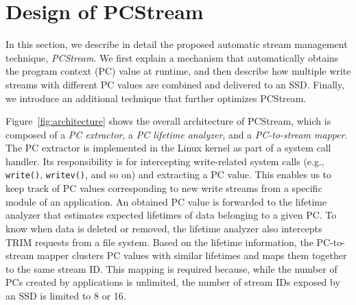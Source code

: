 \section{Design of PCStream}
In this section, we describe in detail the proposed automatic stream management
technique, \textit{PCStream}.  We first explain a mechanism that automatically
obtains the program context (PC) value at runtime, and then describe how
multiple write streams with different PC values are combined and delivered to
an SSD. Finally, we introduce an additional technique that further optimizes
PCStream.


Figure~\ref{fig:architecture} shows the overall architecture of PCStream, which
is composed of a \textit{PC extractor}, a \textit{PC lifetime analyzer}, and a
\textit{PC-to-stream mapper}.  The PC extractor is implemented in the Linux
kernel as part of a system call handler. Its responsibility is for intercepting
write-related system calls (e.g., \texttt{write()}, \texttt{writev()}, and so
on) and extracting a PC value.  This enables us to keep track of PC values
corresponding to new write streams from a specific module of an application. An
obtained PC value is forwarded to the lifetime analyzer that estimates expected
lifetimes of data belonging to a given PC. To know when data is deleted or
removed, the lifetime analyzer also intercepts TRIM requests from a file
system.  Based on the lifetime information, the PC-to-stream mapper clusters PC
values with similar lifetimes and maps them together to the same stream ID.
This mapping is required because, while the number of PCs created by applications is unlimited, the
number of stream IDs exposed by an SSD is limited to 8 or 16.


